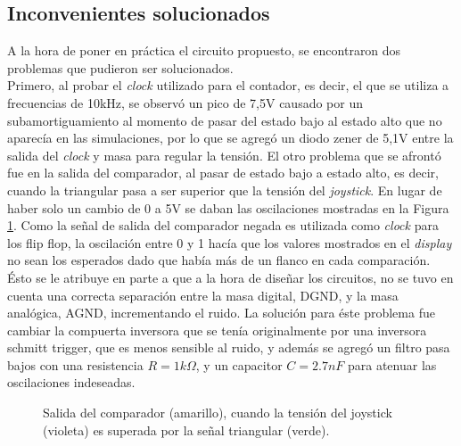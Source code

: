 \documentclass[11pt, a4paper]{article}
\begin{document}
\subsection{Inconvenientes solucionados}
A la hora de poner en pr\'actica el circuito propuesto, se encontraron dos problemas que pudieron ser solucionados.\\
Primero, al probar el \textit{clock} utilizado para el contador, es decir, el que se utiliza a frecuencias de 10kHz, se observ\'o un pico de 7,5V causado por un subamortiguamiento al momento de pasar del estado bajo al estado alto que no aparec\'ia en las simulaciones, por lo que se agreg\'o un diodo zener de 5,1V entre la salida del \textit{clock} y masa para regular la tensi\'on.\newline
El otro problema que se afront\'o fue en la salida del comparador, al pasar de estado bajo a estado alto, es decir, cuando la triangular pasa a ser superior que la tensi\'on del \textit{joystick}. En lugar de haber solo un cambio de 0 a 5V se daban las oscilaciones mostradas en la Figura \ref{fig:salida_comp}. Como la se\~nal de salida del comparador negada es utilizada como \textit{clock} para los flip flop, la oscilaci\'on entre 0 y 1 hac\'ia que los valores mostrados en el \textit{display} no sean los esperados dado que hab\'ia m\'as de un flanco en cada comparaci\'on. \'Esto se le atribuye en parte a que a la hora de dise\~nar los circuitos, no se tuvo en cuenta una correcta separaci\'on entre la masa digital, DGND, y la masa anal\'ogica, AGND, incrementando el ruido. La soluci\'on para \'este problema fue cambiar la compuerta inversora que se ten\'ia originalmente por una inversora schmitt trigger, que es menos sensible al ruido, y adem\'as se agreg\'o un filtro pasa bajos con una resistencia $R=1k\Omega$, y un capacitor $C=2.7nF$ para atenuar las oscilaciones indeseadas.
%
\begin{figure}[H]
	\centering
	\caption{Salida del comparador (amarillo), cuando la tensi\'on del joystick (violeta) es superada por la señal triangular (verde).}
	\label{fig:salida_comp}
\end{figure}
%
\end{document}
